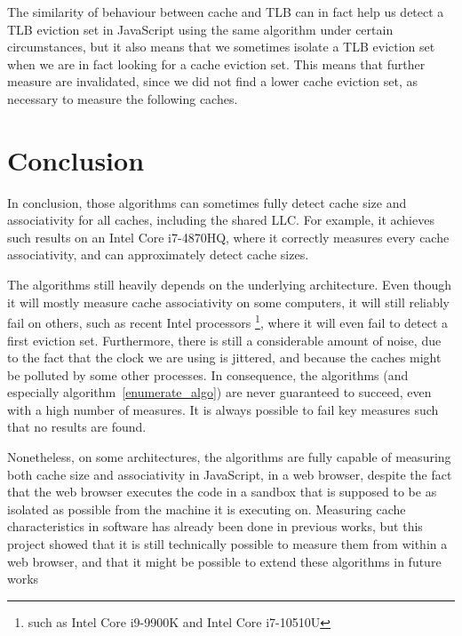 \documentclass[a4paper,11pt,oneside]{report}
\begin{document}
The similarity of behaviour between cache and TLB can in fact help us detect a TLB eviction set in JavaScript using the same algorithm under certain circumstances, but it also means that we sometimes isolate a TLB eviction set when we are in fact looking for a cache eviction set. This means that further measure are invalidated, since we did not find a lower cache eviction set, as necessary to measure the following caches.

\chapter{Conclusion}


In conclusion, those algorithms can sometimes fully detect cache size and associativity for all caches, including the shared LLC. For example, it achieves such results on an Intel Core i7-4870HQ, where it correctly measures every cache associativity, and can approximately detect cache sizes.

The algorithms still heavily depends on the underlying architecture. Even though it will mostly measure cache associativity on some computers, it will still reliably fail on others, such as recent Intel processors \footnote{such as Intel Core i9-9900K and Intel Core i7-10510U}, where it will even fail to detect a first eviction set. Furthermore, there is still a considerable amount of noise, due to the fact that the clock we are using is jittered, and because the caches might be polluted by some other processes. In consequence, the algorithms (and especially algorithm~\ref{enumerate_algo}) are never guaranteed to succeed, even with a high number of measures. It is always possible to fail key measures such that no results are found.

Nonetheless, on some architectures, the algorithms are fully capable of measuring both cache size and associativity in JavaScript, in a web browser, despite the fact that the web browser executes the code in a sandbox that is supposed to be as isolated as possible from the machine it is executing on. Measuring cache characteristics in software has already been done in previous works, but this project showed that it is still technically possible to measure them from within a web browser, and that it might be possible to extend these algorithms in future works

\cleardoublepage
{}
{}
\printbibliography
\end{document}
